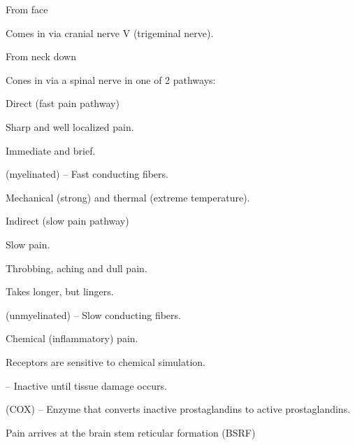\begin{coloredlist}
    \item From face
    \begin{coloredlist}
        \item Comes in via cranial nerve V (trigeminal nerve).
    \end{coloredlist}
    \item From neck down
    \begin{coloredlist}
        \item Cones in via a spinal nerve in one of 2 pathways:
        \begin{coloredlist}
            \item Direct (fast pain pathway)
            \begin{coloredlist}
                \item Sharp and well localized pain.
                \item Immediate and brief.
                \item {} (myelinated) -- Fast conducting fibers.
                \item Mechanical (strong) and thermal (extreme temperature).
            \end{coloredlist}
            \item Indirect (slow pain pathway)
            \begin{coloredlist}
                \item Slow pain.
                \item Throbbing, aching and dull pain.
                \item Takes longer, but lingers.
                \item {} (unmyelinated) -- Slow conducting fibers.
                \item Chemical (inflammatory) pain.
                \item Receptors are sensitive to chemical simulation.
                \item {} -- Inactive until tissue damage occurs.
                \begin{coloredlist}
                    \item {} (COX) -- Enzyme that converts inactive prostaglandins to active prostaglandins.
                \end{coloredlist}         
                \item Pain arrives at the brain stem reticular formation (BSRF)

\end{coloredlist}
\end{coloredlist}
\end{coloredlist}
\end{coloredlist}
